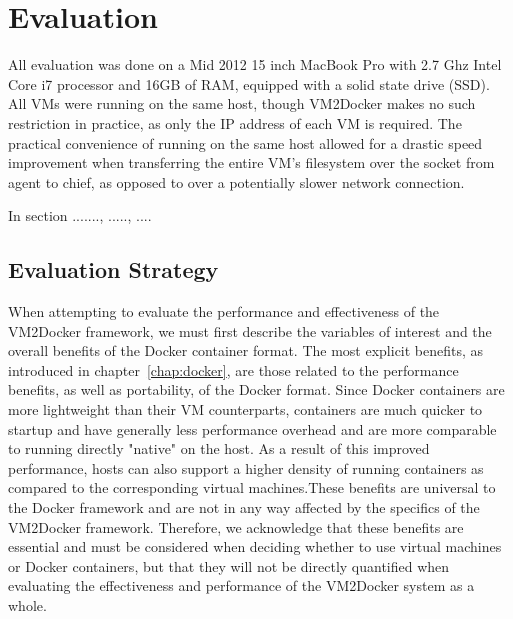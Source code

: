 \chapter{Evaluation}
\label{chap:eval}
All evaluation was done on a Mid 2012 15 inch MacBook Pro with 2.7 Ghz Intel Core i7 processor and 16GB of RAM, equipped with a solid state drive (SSD). All VMs were running on the same host, though VM2Docker makes no such restriction in practice, as only the IP address of each VM is required. The practical convenience of running on the same host allowed for a drastic speed improvement when transferring the entire VM's filesystem over the socket from agent to chief, as opposed to over a potentially slower network connection.

In section ......., ....., ....

\section{Evaluation Strategy}
When attempting to evaluate the performance and effectiveness of the VM2Docker framework, we must first describe the variables of interest and the overall benefits of the Docker container format. The most explicit benefits, as introduced in chapter~\ref{chap:docker}, are those related to the performance benefits, as well as portability, of the Docker format. Since Docker containers are more lightweight than their VM counterparts, containers are much quicker to startup and have generally less performance overhead and are more comparable to running directly "native" on the host. As a result of this improved performance, hosts can also support a higher density of running containers as compared to the corresponding virtual machines.These benefits are universal to the Docker framework and are not in any way affected by the specifics of the VM2Docker framework. Therefore, we acknowledge that these benefits are essential and must be considered when deciding whether to use virtual machines or Docker containers, but that they will not be directly quantified when evaluating the effectiveness and performance of the VM2Docker system as a whole.

